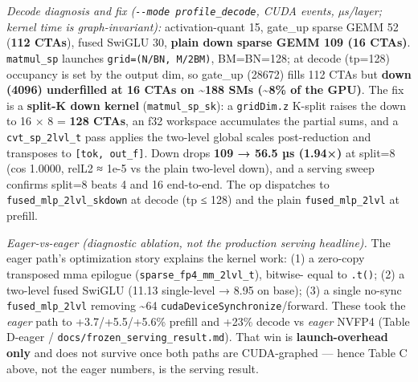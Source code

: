 \documentclass[
]{article}
\begin{document}
\emph{Decode diagnosis and fix (\texttt{-\/-mode\ profile\_decode}, CUDA
events, µs/layer; kernel time is graph-invariant):} activation-quant 15,
gate\_up sparse GEMM 52 (\textbf{112 CTAs}), fused SwiGLU 30,
\textbf{plain down sparse GEMM 109 (16 CTAs)}. \texttt{matmul\_sp}
launches \texttt{grid=(N/BN,\ M/2BM)}, BM=BN=128; at decode (tp=128)
occupancy is set by the output dim, so gate\_up (28672) fills 112 CTAs
but \textbf{down (4096) underfilled at 16 CTAs on \textasciitilde188 SMs
(\textasciitilde8\% of the GPU)}. The fix is a \textbf{split-K down
kernel} (\texttt{matmul\_sp\_sk}): a \texttt{gridDim.z} K-split raises
the down to 16 × 8 = \textbf{128 CTAs}, an f32 workspace accumulates the
partial sums, and a \texttt{cvt\_sp\_2lvl\_t} pass applies the two-level
global scales post-reduction and transposes to
\texttt{{[}tok,\ out\_f{]}}. Down drops \textbf{109 → 56.5 µs (1.94×)}
at split=8 (cos 1.0000, relL2 ≈ 1e-5 vs the plain two-level down), and a
serving sweep confirms split=8 beats 4 and 16 end-to-end. The op
dispatches to \texttt{fused\_mlp\_2lvl\_skdown} at decode (tp ≤ 128) and
the plain \texttt{fused\_mlp\_2lvl} at prefill.

\emph{Eager-vs-eager (diagnostic ablation, not the production serving
headline).} The eager path's optimization story explains the kernel
work: (1) a zero-copy transposed mma epilogue
(\texttt{sparse\_fp4\_mm\_2lvl\_t}), bitwise- equal to \texttt{.t()};
(2) a two-level fused SwiGLU (11.13 single-level → 8.95 on base); (3) a
single no-sync \texttt{fused\_mlp\_2lvl} removing \textasciitilde64
\texttt{cudaDeviceSynchronize}/forward. These took the \emph{eager} path
to +3.7/+5.5/+5.6\% prefill and +23\% decode vs \emph{eager} NVFP4
(Table D-eager / \texttt{docs/frozen\_serving\_result.md}). That win is
\textbf{launch-overhead only} and does not survive once both paths are
CUDA-graphed --- hence Table C above, not the eager numbers, is the
serving result.
\end{document}
